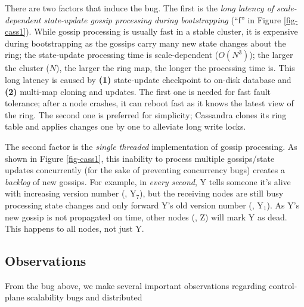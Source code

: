 There are two factors that induce the bug.  The first is the {\em long latency
of scale-dependent state-update gossip processing during bootstrapping} (``f''
in Figure \ref{fig-cass1}).  While gossip processing is usually fast in a stable
cluster, it is expensive during bootstrapping as the gossips carry many new
state changes about the ring; the state-update processing time is
scale-dependent ($O(N^3)$); the larger the cluster ($N$), the larger the ring
map, the longer the processing time is.
%
This long latency is caused by {\bf (1)} state-update checkpoint to on-disk
database and {\bf (2)} multi-map cloning and updates.
%
The first one is needed for fast fault tolerance; after a node crashes, it can
reboot fast as it knows the latest view of the ring.
%
The second one is preferred for simplicity; Cassandra clones its 
ring table and applies changes one by one to alleviate long write locks.
%

The second factor is the {\em single threaded} implementation of gossip
processing.  As shown in Figure \ref{fig-cass1},  this inability to process
multiple gossips/state updates concurrently (for the sake of preventing
concurrency bugs) creates a {\em backlog} of new gossips.  For example, in {\em
every second}, Y tells someone it's alive with increasing version number (\eg,
Y$_7$), but the receiving nodes are still busy processing state changes and only
forward Y's old version number (\eg, Y$_1$).  As Y's new gossip is not
propagated on time,  other nodes (\eg, Z) will mark Y as dead.  This happens to
all nodes, not just Y.

\subsection{Observations}
\label{sec-scobs}

From the bug above, we make several important observations regarding
control-plane scalability bugs and distributed

